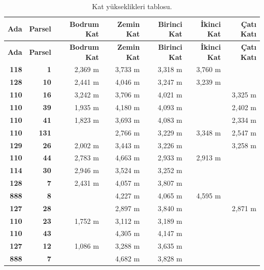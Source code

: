 \documentclass[12pt,turkish,a4paperpaper,]{report}
\begin{document}
\begin{longtable}[]{@{}rrrrrrr@{}}
\caption{Kat yükseklikleri tablosu.}\tabularnewline
\toprule
\textbf{Ada} & \textbf{Parsel} & \textbf{Bodrum Kat} & \textbf{Zemin
Kat} & \textbf{Birinci Kat} & \textbf{İkinci Kat} & \textbf{Çatı
Katı}\tabularnewline
\midrule
\endfirsthead
\toprule
\textbf{Ada} & \textbf{Parsel} & \textbf{Bodrum Kat} & \textbf{Zemin
Kat} & \textbf{Birinci Kat} & \textbf{İkinci Kat} & \textbf{Çatı
Katı}\tabularnewline
\midrule
\endhead
\textbf{118} & \textbf{1} & 2,369 m & 3,733 m & 3,318 m & 3,760 m
&\tabularnewline
\textbf{128} & \textbf{10} & 2,441 m & 4,046 m & 3,247 m & 3,239 m
&\tabularnewline
\textbf{110} & \textbf{16} & 3,242 m & 3,706 m & 4,021 m & & 3,325
m\tabularnewline
\textbf{110} & \textbf{39} & 1,935 m & 4,180 m & 4,093 m & & 2,402
m\tabularnewline
\textbf{110} & \textbf{41} & 1,823 m & 3,693 m & 4,083 m & & 2,334
m\tabularnewline
\textbf{110} & \textbf{131} & & 2,766 m & 3,229 m & 3,348 m & 2,547
m\tabularnewline
\textbf{129} & \textbf{26} & 2,002 m & 3,443 m & 3,226 m & & 3,258
m\tabularnewline
\textbf{110} & \textbf{44} & 2,783 m & 4,663 m & 2,933 m & 2,913 m
&\tabularnewline
\textbf{114} & \textbf{30} & 2,946 m & 3,524 m & 3,252 m &
&\tabularnewline
\textbf{128} & \textbf{7} & 2,431 m & 4,057 m & 3,807 m &
&\tabularnewline
\textbf{888} & \textbf{8} & & 4,227 m & 4,065 m & 4,595 m
&\tabularnewline
\textbf{127} & \textbf{28} & & 2,897 m & 3,840 m & & 2,871
m\tabularnewline
\textbf{110} & \textbf{23} & 1,752 m & 3,112 m & 3,189 m &
&\tabularnewline
\textbf{110} & \textbf{43} & & 4,305 m & 4,147 m & &\tabularnewline
\textbf{127} & \textbf{12} & 1,086 m & 3,288 m & 3,635 m &
&\tabularnewline
\textbf{888} & \textbf{7} & & 4,682 m & 3,828 m & &\tabularnewline
\bottomrule
\end{longtable}
\end{document}
